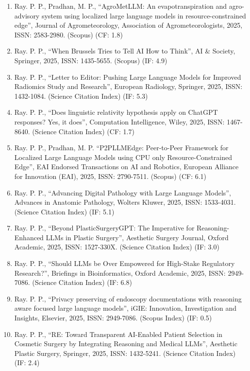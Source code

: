 \documentclass[11pt,a4paper]{moderncv}
\begin{document}
\begin{adjustwidth}{6em}{0pt}
	\begin{enumerate}
		
		\item Ray. P. P., Pradhan, M. P., “AgroMetLLM: An evapotranspiration and agro-advisory system using localized large language models in resource-constrained edge”, Journal of Agrometeorology, Association of Agrometeorologists, 2025, ISSN: 2583-2980. (Scopus) (CF: 1.8)
		\item Ray. P. P., “When Brussels Tries to Tell AI How to Think”, AI \& Society, Springer, 2025, ISSN: 1435-5655. (Scopus) (IF: 4.9)
		\item Ray. P. P., “Letter to Editor: Pushing Large Language Models for Improved Radiomics Study and Research”, European Radiology, Springer, 2025, ISSN: 1432-1084. (Science Citation Index) (IF: 5.3)
		\item Ray. P. P., “Does linguistic relativity hypothesis apply on ChatGPT responses? Yes, it does”, Computation Intelligence, Wiley, 2025, ISSN: 1467-8640. (Science Citation Index) (CF: 1.7)
		\item Ray. P. P., Pradhan, M. P. “P2PLLMEdge: Peer-to-Peer Framework for Localized Large Language Models using CPU only Resource-Constrained Edge”, EAI Endorsed Transactions on AI and Robotics, European Alliance for Innovation (EAI), 2025, ISSN: 2790-7511. (Scopus) (CF: 6.1)
		\item Ray. P. P., “Advancing Digital Pathology with Large Language Models”, Advances in Anatomic Pathology, Wolters Kluwer, 2025, ISSN: 1533-4031. (Science Citation Index) (IF: 5.1)
		\item Ray. P. P., “Beyond PlasticSurgeryGPT: The Imperative for Reasoning-Enhanced LLMs in Plastic Surgery”, Aesthetic Surgery Journal, Oxford Academic, 2025, ISSN: 1527-330X. (Science Citation Index) (IF: 3.0)
		\item Ray. P. P., “Should LLMs be Over Empowered for High-Stake Regulatory Research?”, Briefings in Bioinformatics, Oxford Academic, 2025, ISSN: 2949-7086. (Science Citation Index) (IF: 6.8)
		\item Ray. P. P., “Privacy preserving of endoscopy documentations with reasoning aware focused large language models”, iGIE: Innovation, Investigation and Insights, Elsevier, 2025, ISSN: 2949-7086. (Scopus Index) (IF: 0.5)
		\item Ray. P. P., “RE: Toward Transparent AI-Enabled Patient Selection in Cosmetic Surgery by Integrating Reasoning and Medical LLMs”, Aesthetic Plastic Surgery, Springer, 2025, ISSN: 1432-5241. (Science Citation Index) (IF: 2.4)

\end{enumerate}
\end{adjustwidth}
\end{document}
